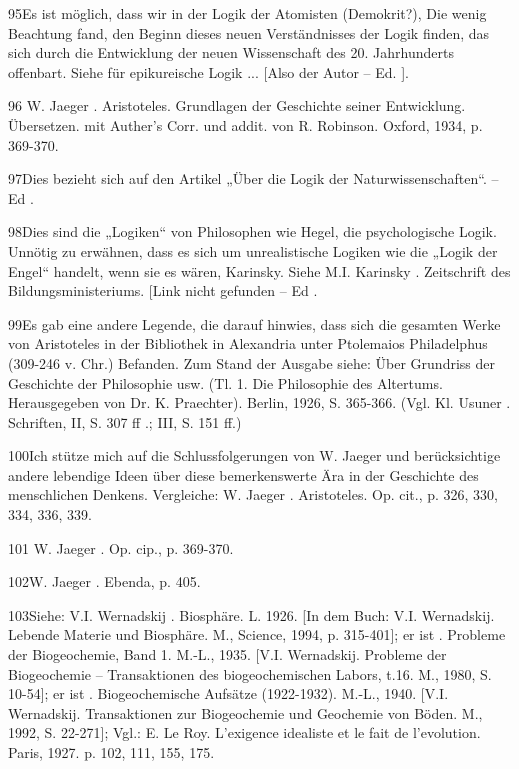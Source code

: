 \documentclass[11pt,a4paper]{book}
\begin{document}
95Es ist möglich, dass wir in der Logik der Atomisten (Demokrit?), Die wenig Beachtung fand, den Beginn dieses neuen Verständnisses der Logik finden, das sich durch die Entwicklung der neuen Wissenschaft des 20. Jahrhunderts offenbart. Siehe für epikureische Logik ... [Also der Autor -- Ed. ].



96 W. Jaeger . Aristoteles. Grundlagen der Geschichte seiner Entwicklung. Übersetzen. mit Auther's Corr. und addit. von R. Robinson. Oxford, 1934, p. 369-370.



97Dies bezieht sich auf den Artikel „Über die Logik der Naturwissenschaften“. -- Ed .



98Dies sind die „Logiken“ von Philosophen wie Hegel, die psychologische Logik. Unnötig zu erwähnen, dass es sich um unrealistische Logiken wie die „Logik der Engel“ handelt, wenn sie es wären, Karinsky. Siehe M.I. Karinsky . Zeitschrift des Bildungsministeriums. [Link nicht gefunden -- Ed .



99Es gab eine andere Legende, die darauf hinwies, dass sich die gesamten Werke von Aristoteles in der Bibliothek in Alexandria unter Ptolemaios Philadelphus (309-246 v. Chr.) Befanden. Zum Stand der Ausgabe siehe: Über Grundriss der Geschichte der Philosophie usw. (Tl. 1. Die Philosophie des Altertums. Herausgegeben von Dr. K. Praechter). Berlin, 1926, S. 365-366. (Vgl. Kl. Usuner . Schriften, II, S. 307 ff .; III, S. 151 ff.)



100Ich stütze mich auf die Schlussfolgerungen von W. Jaeger und berücksichtige andere lebendige Ideen über diese bemerkenswerte Ära in der Geschichte des menschlichen Denkens. Vergleiche: W. Jaeger . Aristoteles. Op. cit., p. 326, 330, 334, 336, 339.



101 W. Jaeger . Op. cip., p. 369-370.



102W. Jaeger . Ebenda, p. 405.



103Siehe: V.I. Wernadskij . Biosphäre. L. 1926. [In dem Buch: V.I. Wernadskij. Lebende Materie und Biosphäre. M., Science, 1994, p. 315-401]; er ist . Probleme der Biogeochemie, Band 1. M.-L., 1935. [V.I. Wernadskij. Probleme der Biogeochemie -- Transaktionen des biogeochemischen Labors, t.16. M., 1980, S. 10-54]; er ist . Biogeochemische Aufsätze (1922-1932). M.-L., 1940. [V.I. Wernadskij. Transaktionen zur Biogeochemie und Geochemie von Böden. M., 1992, S. 22-271]; Vgl.: E. Le Roy. L'exigence idealiste et le fait de l'evolution. Paris, 1927. p. 102, 111, 155, 175.
\end{document}
